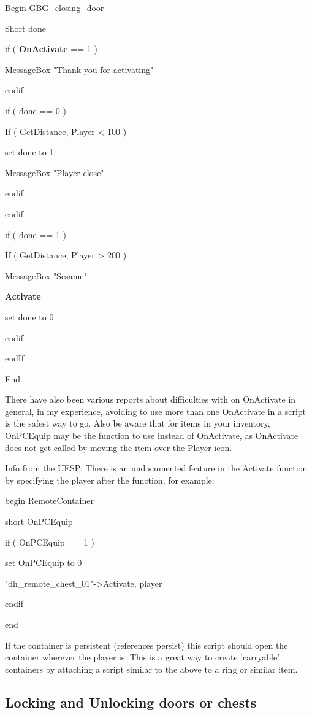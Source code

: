 \documentclass[
]{article}
\begin{document}
Begin GBG\_closing\_door

Short done

if ( \textbf{OnActivate} == 1 )

MessageBox "Thank you for activating"

endif

if ( done == 0 )

If ( GetDistance, Player \textless{} 100 )

set done to 1

MessageBox "Player close"

endif

endif

if ( done == 1 )

If ( GetDistance, Player \textgreater{} 200 )

MessageBox "Sesame"

\textbf{Activate}

set done to 0

endif

endIf

End

There have also been various reports about difficulties with on
OnActivate in general, in my experience, avoiding to use more than one
OnActivate in a script is the safest way to go. Also be aware that for
items in your inventory, OnPCEquip may be the function to use instead of
OnActivate, as OnActivate does not get called by moving the item over
the Player icon.

Info from the UESP: There is an undocumented feature in the Activate
function by specifying the player after the function, for example:

begin RemoteContainer

short OnPCEquip

if ( OnPCEquip == 1 )

set OnPCEquip to 0

"dh\_remote\_chest\_01"-\textgreater Activate, player

endif

end

If the container is persistent (references persist) this script should
open the container wherever the player is. This is a great way to create
'carryable' containers by attaching a script similar to the above to a
ring or similar item.

\hypertarget{locking-and-unlocking-doors-or-chests}{%
\subsection{\texorpdfstring{\hfill\break
Locking and Unlocking doors or
chests}{ Locking and Unlocking doors or chests}}\label{locking-and-unlocking-doors-or-chests}}
\end{document}
